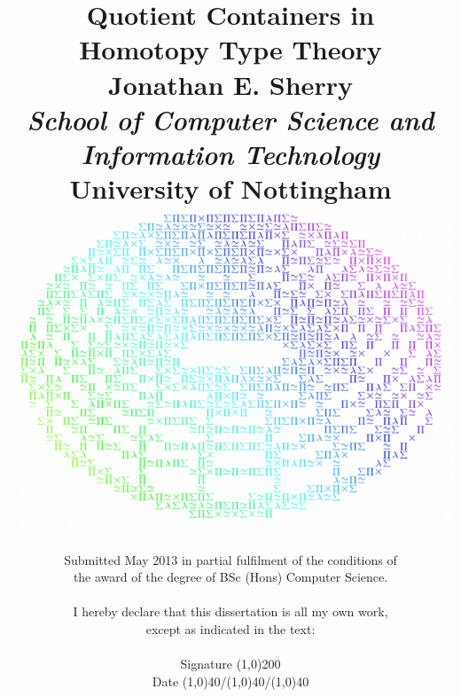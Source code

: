 \documentclass[12pt]{report}
\begin{document}
\setcounter{page}{-100}
\date{}
\title{\textbf{Quotient Containers in\\ Homotopy Type Theory\\}
Jonathan E. Sherry\\
\vspace{10pt}
    { \large
    \textit{School of Computer Science and Information Technology}\\
    \textbf{University of Nottingham}\\
    }
\vspace{45pt}
\includegraphics[scale=0.45]{1.png}\\
}
\author{Submitted May 2013 in partial fulfilment of the conditions of\\
the award of the degree of BSc (Hons) Computer Science.\\
\\
I hereby declare that this dissertation is all my own work,\\
except as indicated in the text:\\
\\
Signature \line(1,0){200}\\
Date \line(1,0){40}/\line(1,0){40}/\line(1,0){40}\\
}

\thispagestyle{empty}
\maketitle

\tableofcontents

\pagestyle{fancy}
\lhead[]{\thepage}
\rhead[\thepage]{}
\end{document}
